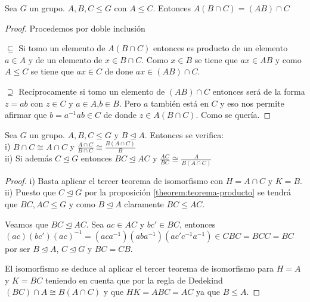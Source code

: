 \begin{nprop}
Sea $G$ un grupo. $A,B,C \le G$ con $A \le C$. Entonces $A(B \cap C) = (AB) \cap C$
\end{nprop}
\begin{proof}
Procedemos por doble inclusión

$\subseteq$ Si tomo un elemento de $A(B \cap C)$ entonces es producto de un elemento $a \in A$ y de un elemento de $x \in B \cap C$. Como $x \in B$ se tiene que $ax \in AB$ y como $A \le C$ se tiene que $ax \in C$ de done $ax \in (AB) \cap C$.

$\supseteq$ Recíprocamente si tomo un elemento de $(AB) \cap C$ entonces será de la forma $z = ab$ con $z \in C$ y $a \in A$,$b \in B$. Pero $a$ también está en $C$ y eso nos permite afirmar que $b = a^{-1}ab \in C$ de donde $z \in A(B \cap C)$. Como se quería.
\end{proof}

\begin{nprop}\label{lemma:consecuencia-tercer-teorema-isomorfia}
Sea $G$ un grupo. $A,B,C \le G$ y $B \trianglelefteq A$. Entonces se verifica:\\
i) $B \cap C \cong A \cap C$ y $\frac{A \cap C}{B \cap C} \cong \frac{B(A \cap C)}{B}$\\
ii) Si además $C \trianglelefteq G$ entonces $BC \trianglelefteq AC$ y $\frac{AC}{BC} \cong \frac{A}{B(A \cap C)}$
\end{nprop}
\begin{proof}
i) Basta aplicar el tercer teorema de isomorfismo con $H = A \cap C$ y $K = B$.\\
ii) Puesto que $C \trianglelefteq G$ por la proposición \ref{theorem:teorema-producto} se tendrá que $BC,AC \le G$ y como $B \trianglelefteq A$ claramente $BC \le AC$.

Veamos que $BC \trianglelefteq AC$. Sea $ac \in AC$ y $bc' \in BC$, entonces $(ac)(bc')(ac)^{-1} = (aca^{-1})(aba^{-1})(ac'c^{-1}a^{-1}) \in CBC = BCC = BC$ por ser $B \trianglelefteq A$, $C \trianglelefteq G$ y $BC =CB$.

El isomorfismo se deduce al aplicar el tercer teorema de isomorfismo para $H = A$ y $K = BC$ teniendo en cuenta que por la regla de Dedekind $(BC) \cap A \cong B(A \cap C)$ y que $HK = ABC = AC$ ya que $B \le A$.
\end{proof}

